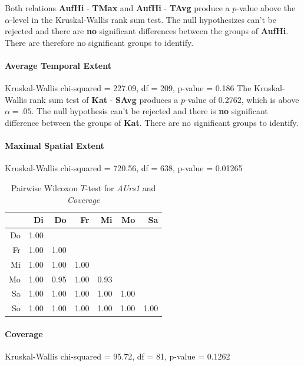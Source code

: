 Both relations \textbf{AufHi} - \textbf{TMax} and \textbf{AufHi} - \textbf{TAvg} produce a $p$-value above the $\alpha$-level in the Kruskal-Wallis rank sum test. The null hypothesizes can't be rejected and there are \textbf{no} significant differences between the groups of \textbf{AufHi}. There are therefore no significant groups to identify.


\paragraph{Average Temporal Extent}
Kruskal-Wallis chi-squared = 227.09, df = 209, p-value = 0.186
The Kruskal-Wallis rank sum test of \textbf{Kat} - \textbf{SAvg} produces a $p$-value of 0.2762, which is above $\alpha=.05$. The null hypothesis can't be rejected and there is \textbf{no} significant difference between the groups of \textbf{Kat}. There are no significant groups to identify.

\paragraph{Maximal Spatial Extent}
Kruskal-Wallis chi-squared = 720.56, df = 638, p-value = 0.01265

\begin{table}[ht]
	\small
	\centering
	\begin{tabular}{rrrrrrr}
		\hline
	& Di & Do & Fr & Mi & Mo & Sa \\ 
		\hline
	Do & 1.00 &  &  &  &  &  \\ 
		Fr & 1.00 & 1.00 &  &  &  &  \\ 
		Mi & 1.00 & 1.00 & 1.00 &  &  &  \\ 
		Mo & 1.00 & 0.95 & 1.00 & 0.93 &  &  \\ 
		Sa & 1.00 & 1.00 & 1.00 & 1.00 & 1.00 &  \\ 
		So & 1.00 & 1.00 & 1.00 & 1.00 & 1.00 & 1.00 \\ 
		\hline
	  \end{tabular}
    \caption{Pairwise Wilcoxon $T$-test for \textit{AUrs1} and \textit{Coverage}}
    \label{tbl:wilcoxon_baysis_effector_AUrs1_Cov}
\end{table}

\paragraph{Coverage}
Kruskal-Wallis chi-squared = 95.72, df = 81, p-value = 0.1262

